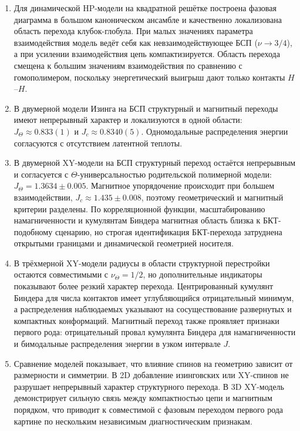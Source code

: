\begin{enumerate}
	 
		\item Для динамической HP-модели на квадратной решётке построена фазовая диаграмма в большом каноническом ансамбле и качественно локализована область перехода клубок-глобула. При малых значениях параметра взаимодействия модель ведёт себя как невзаимодействующее БСП ($\nu \to 3/4$), а при усилении взаимодействия цепь компактизируется. Область перехода смещена к большим значениям взаимодействия по сравнению с гомополимером, поскольку энергетический выигрыш дают только контакты $H$--$H$.
		\item В двумерной модели Изинга на БСП структурный и магнитный переходы имеют непрерывный характер и локализуются в одной области: $J_{\Theta}\approx0.833(1)$ и $J_c\approx0.8340(5)$. Одномодальные распределения энергии согласуются с отсутствием латентной теплоты.
		\item В двумерной XY-модели на БСП структурный переход остаётся непрерывным и согласуется с $\Theta$-универсальностью родительской полимерной модели: $J_{\Theta}=1.3634\pm0.005$. Магнитное упорядочение происходит при большем взаимодействии, $J_c\approx1.435\pm0.008$, поэтому геометрический и магнитный критерии разделены. По корреляционной функции, масштабированию намагниченности и кумулянтам Биндера магнитная область близка к БКТ-подобному сценарию, но строгая идентификация БКТ-перехода затруднена открытыми границами и динамической геометрией носителя.
		\item В трёхмерной XY-модели радиусы в области структурной перестройки остаются совместимыми с $\nu_{\Theta}=1/2$, но дополнительные индикаторы показывают более резкий характер перехода. Центрированный кумулянт Биндера для числа контактов имеет углубляющийся отрицательный минимум, а распределения наблюдаемых указывают на сосуществование развернутых и компактных конформаций. Магнитный переход также проявляет признаки первого рода: отрицательный провал кумулянта Биндера для намагниченности и бимодальные распределения энергии в узком интервале $J$.
		\item Сравнение моделей показывает, что влияние спинов на геометрию зависит от размерности и симметрии. В 2D добавление изинговских или XY-спинов не разрушает непрерывный характер структурного перехода. В 3D XY-модель демонстрирует сильную связь между компактностью цепи и магнитным порядком, что приводит к совместимой с фазовым переходом первого рода картине по нескольким независимым диагностическим признакам.
	  
\end{enumerate} 

